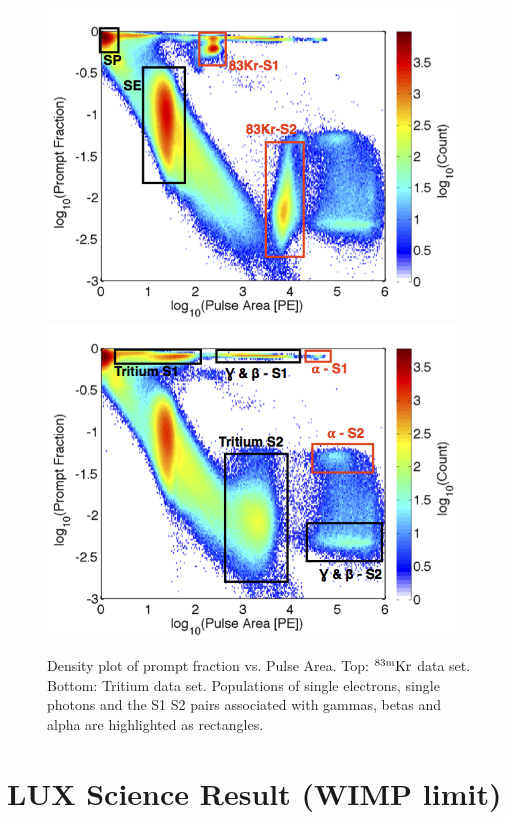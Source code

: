  \begin{figure}[h!]\centering
\includegraphics[width=110mm]{Chapter_LUX_Det/Kr_83_Density_text.png}
\includegraphics[width=110mm]{Chapter_LUX_Det/T_Density_text.png}
\caption{Density plot of prompt fraction vs. Pulse Area. Top: $\rm^{83m}Kr$ data set. Bottom: Tritium data set. Populations of single electrons, single photons and the S1 S2 pairs associated with gammas, betas and alpha are highlighted as rectangles.}
\label{fig:Prompt_Fraction}
\end{figure}


\section{LUX Science Result (WIMP limit)}

